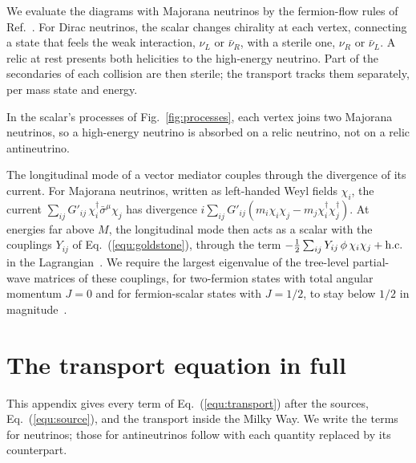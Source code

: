 \documentclass[linenumbers, aps, prd, twocolumn, superscriptaddress, floatfix, longbibliography, nofootinbib, bibnotes]{revtex4-2}
\begin{document}
We evaluate the diagrams with Majorana neutrinos by the fermion-flow rules of Ref.~\cite{Denner:1992me}.
For Dirac neutrinos, the scalar changes chirality at each vertex, connecting a state that feels the weak interaction, $\nu_L$ or $\bar\nu_R$, with a sterile one, $\nu_R$ or $\bar\nu_L$.
A relic at rest presents both helicities to the high-energy neutrino.
Part of the secondaries of each collision are then sterile; the transport tracks them separately, per mass state and energy.

In the scalar's processes of Fig.~\ref{fig:processes}, each vertex joins two Majorana neutrinos, so a high-energy neutrino is absorbed on a relic neutrino, not on a relic antineutrino.

The longitudinal mode of a vector mediator couples through the divergence of its current.
For Majorana neutrinos, written as left-handed Weyl fields $\chi_i$, the current $\sum_{ij} G'_{ij}\, \chi_i^\dagger \bar\sigma^\mu \chi_j$ has divergence $i \sum_{ij} G'_{ij} (m_i \chi_i \chi_j - m_j \chi_i^\dagger \chi_j^\dagger)$.
At energies far above $M$, the longitudinal mode then acts as a scalar with the couplings $Y_{ij}$ of Eq.~(\ref{equ:goldstone}), through the term $-\frac{1}{2} \sum_{ij} Y_{ij}\, \phi\, \chi_i \chi_j + {\rm h.c.}$ in the Lagrangian~\cite{Allwicher:2021rtd}.
We require the largest eigenvalue of the tree-level partial-wave matrices of these couplings, for two-fermion states with total angular momentum $J = 0$ and for fermion-scalar states with $J = 1/2$, to stay below $1/2$ in magnitude~\cite{Allwicher:2021rtd}.


\section{The transport equation in full}
\label{app:transport}
This appendix gives every term of Eq.~(\ref{equ:transport}) after the sources, Eq.~(\ref{equ:source}), and the transport inside the Milky Way.
We write the terms for neutrinos; those for antineutrinos follow with each quantity replaced by its counterpart.
\end{document}
